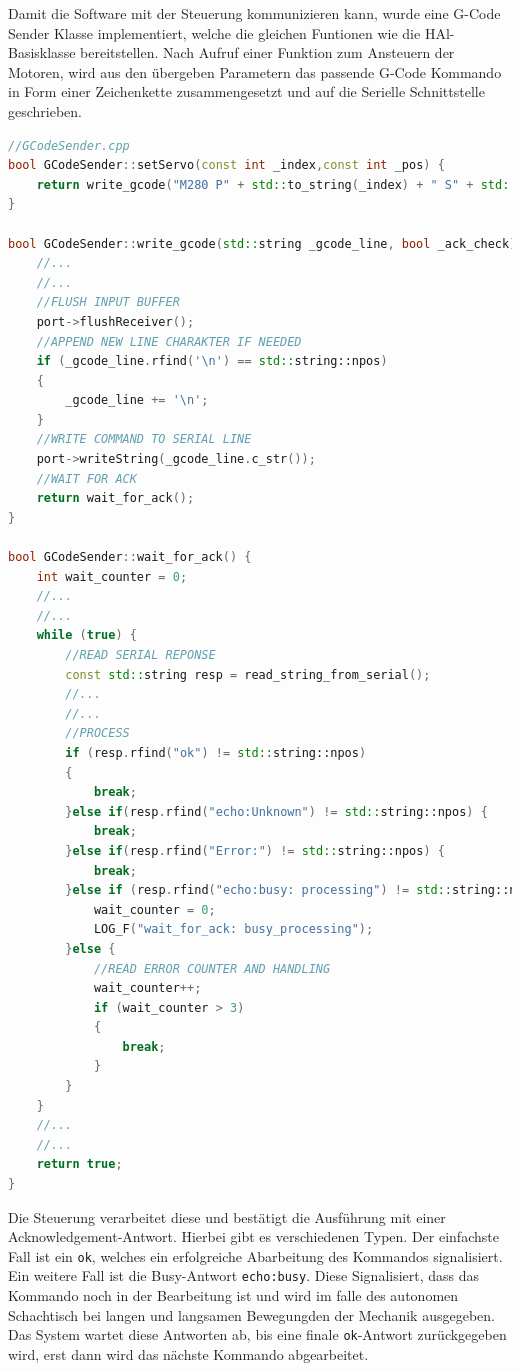 Damit die Software mit der Steuerung kommunizieren kann, wurde eine
G-Code Sender Klasse implementiert, welche die gleichen Funtionen wie
die HAl-Basisklasse bereitstellen. Nach Aufruf einer Funktion zum
Ansteuern der Motoren, wird aus den übergeben Parametern das passende
G-Code Kommando in Form einer Zeichenkette zusammengesetzt und auf die
Serielle Schnittstelle geschrieben.

\begin{lstlisting}[language={C++}]
//GCodeSender.cpp
bool GCodeSender::setServo(const int _index,const int _pos) {
    return write_gcode("M280 P" + std::to_string(_index) + " S" + std::to_string(_pos));     //MOVE SERVO
}

bool GCodeSender::write_gcode(std::string _gcode_line, bool _ack_check) {
    //...
    //...
    //FLUSH INPUT BUFFER
    port->flushReceiver();
    //APPEND NEW LINE CHARAKTER IF NEEDED
    if (_gcode_line.rfind('\n') == std::string::npos)
    {
        _gcode_line += '\n';
    }
    //WRITE COMMAND TO SERIAL LINE
    port->writeString(_gcode_line.c_str());
    //WAIT FOR ACK
    return wait_for_ack();
}

bool GCodeSender::wait_for_ack() {  
    int wait_counter = 0;
    //...
    //...
    while (true) {
        //READ SERIAL REPONSE
        const std::string resp = read_string_from_serial();
        //...
        //...
        //PROCESS
        if (resp.rfind("ok") != std::string::npos)
        {
            break;
        }else if(resp.rfind("echo:Unknown") != std::string::npos) {
            break;
        }else if(resp.rfind("Error:") != std::string::npos) {
            break;          
        }else if (resp.rfind("echo:busy: processing") != std::string::npos) {
            wait_counter = 0;
            LOG_F("wait_for_ack: busy_processing");
        }else {
            //READ ERROR COUNTER AND HANDLING
            wait_counter++;
            if (wait_counter > 3)
            {
                break;
            }
        }   
    }
    //...
    //...
    return true;
}
\end{lstlisting}

Die Steuerung verarbeitet diese und bestätigt die Ausführung mit einer
Acknowledgement-Antwort. Hierbei gibt es verschiedenen Typen. Der
einfachste Fall ist ein \passthrough{\lstinline!ok!}, welches ein
erfolgreiche Abarbeitung des Kommandos signalisiert. Ein weitere Fall
ist die Busy-Antwort \passthrough{\lstinline!echo:busy!}. Diese
Signalisiert, dass das Kommando noch in der Bearbeitung ist und wird im
falle des autonomen Schachtisch bei langen und langsamen Bewegungden der
Mechanik ausgegeben. Das System wartet diese Antworten ab, bis eine
finale \passthrough{\lstinline!ok!}-Antwort zurückgegeben wird, erst
dann wird das nächste Kommando abgearbeitet.

